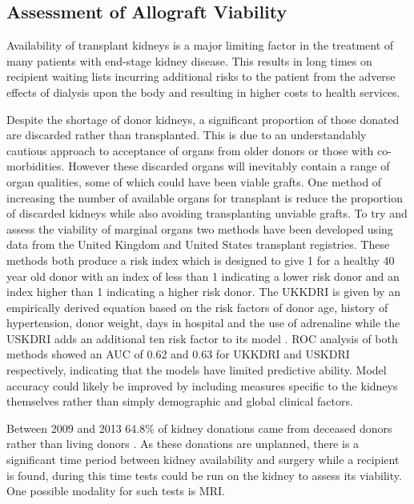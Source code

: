 \subsection{Assessment of Allograft Viability}
Availability of transplant kidneys is a major limiting factor in the treatment of many patients with end-stage kidney disease. This results in long times on recipient waiting lists incurring additional risks to the patient from the adverse effects of dialysis upon the body and resulting in higher costs to health services. 

Despite the shortage of donor kidneys, a significant proportion of those donated are discarded rather than transplanted. This is due to an understandably cautious approach to acceptance of organs from older donors or those with co-morbidities. However these discarded organs will inevitably contain a range of organ qualities, some of which could have been viable grafts. One method of increasing the number of available organs for transplant is reduce the proportion of discarded kidneys while also avoiding transplanting unviable grafts. To try and assess the viability of marginal organs two methods have been developed using data from the United Kingdom and United States transplant registries. These methods both produce a risk index which is designed to give 1 for a healthy 40 year old donor with an index of less than 1 indicating a lower risk donor and an index higher than 1 indicating a higher risk donor. The \ac{UKKDRI} is given by an empirically derived equation based on the risk factors of donor age, history of hypertension, donor weight, days in hospital and the use of adrenaline \cite{watson_simplified_2012} while the \ac{USKDRI} adds an additional ten risk factor to its model \cite{rao_comprehensive_2009}. \ac{ROC} analysis of both methods showed an \ac{AUC} of 0.62 and 0.63 for \ac{UKKDRI} and \ac{USKDRI} respectively, indicating that the models have limited predictive ability. Model accuracy could likely be improved by including measures specific to the kidneys themselves rather than simply demographic and global clinical factors.

Between 2009 and 2013 64.8\% of kidney donations came from deceased donors rather than living donors \cite{burton_causes_2019}. As these donations are unplanned, there is a significant time period between kidney availability and surgery while a recipient is found, during this time tests could be run on the kidney to assess its viability. One possible modality for such tests is \ac{MRI}.

